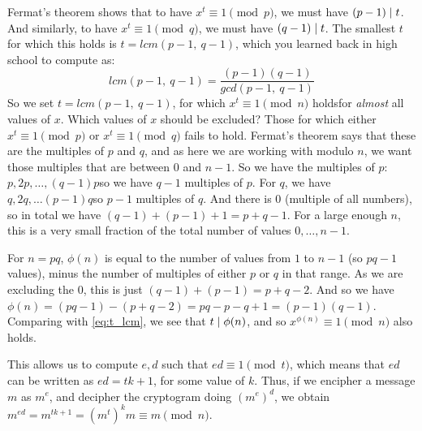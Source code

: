   Fermat's theorem shows that to have $x^t \equiv 1 \pmod{p}$, we must have $(p-1)\mathrel{|} t$. And similarly, to have $x^t \equiv 1 \pmod{q}$, we must have $(q-1)\mathrel{|} t$. The smallest $t$ for which this holds is $t = lcm(p-1,\ q-1)$, which you learned back in high school to compute as:
  \begin{equation}
    \label{eq:t_lcm}
    lcm(p-1,\ q-1) = \frac{(p-1)(q-1)}{gcd(p-1,\ q-1)}
  \end{equation}
  So we set $t = lcm(p-1,\ q-1)$, for which $x^t\equiv 1 \pmod{n}$ holds\emd for \emph{almost} all values of $x$. Which values of $x$ should be excluded? Those for which either $x^t \equiv 1 \pmod{p}$ or $x^t \equiv 1 \pmod{q}$ fails to hold. Fermat's theorem says that these are the multiples of $p$ and $q$, and as here we are working with modulo $n$, we want those multiples that are between $0$ and $n-1$. So we have the multiples of $p$: $p, 2p, \dots, (q-1)p$\emd so we have $q-1$ multiples of $p$. For $q$, we have $q, 2q, \dots (p-1)q$\emd so $p-1$ multiples of $q$. And there is $0$ (multiple of all numbers), so in total we have $(q-1) + (p-1) + 1 = p+q-1$. For a large enough $n$, this is a very small fraction of the total number of values $0, \dots, n-1$.
  \begin{remark}
    \label{rem:n_pq_totient}
    For $n=pq$, $\phi(n)$ is equal to the number of values from $1$ to $n-1$ (so $pq-1$ values), minus the number of multiples of either $p$ or $q$ in that range. As we are excluding the $0$, this is just $(q-1) + (p-1) = p +q - 2$. And so we have $\phi(n) = (pq - 1) - (p + q -2) = pq - p - q + 1 = (p-1)(q - 1)$. Comparing with \eqref{eq:t_lcm}, we see that $t\mathrel{|} \phi(n)$, and so $x^{\phi(n)} \equiv 1\pmod{n}$ also holds.
  \end{remark}

  \medskip

   This allows us to compute $e, d$ such that $ed \equiv 1 \pmod{t}$, which means that $ed$ can be written as $ed = tk + 1$, for some value of $k$. Thus, if we encipher a message $m$ as $m^e$, and decipher the cryptogram doing $(m^{e})^d$, we obtain $m^{ed} = m^{tk +1} = (m^t)^k m \equiv m\pmod{n}$.

